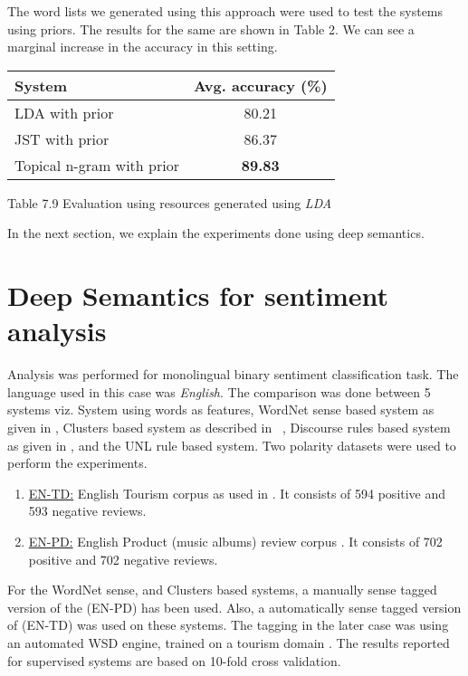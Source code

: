The word lists we generated using this approach were used to test the systems using priors. The results for the same
are shown in Table 2. We can see a marginal increase in the accuracy in this setting.

\begin{center}
\begin{tabular}{|l|c|}
\hline \bf System & \bf Avg. accuracy (\%)\\ \hline
LDA with prior & 80.21\\
JST with prior & 86.37\\
Topical n-gram with prior & \textbf{89.83}\\
\hline
\end{tabular}
\end{center}
\begin{center}
 Table 7.9 Evaluation using resources generated using \textit{LDA}
\end{center}

In the next section, we explain the experiments done using deep semantics.

\section{Deep Semantics for sentiment analysis}

Analysis was performed for monolingual binary sentiment classification task. The language used in this case was \textit{English}. The comparison was done between 5 systems 
viz. System using words as features, WordNet sense based system as given in \citep*{balamurali2011harnessing}, Clusters based system as described in ~\citep*{arhaves}, 
Discourse rules based system as given in \citep*{mukherjee2012sentiment}, and the UNL rule based system. Two polarity datasets were used to perform the experiments. 
    
\begin{enumerate}
  \item \underline{EN-TD:} English Tourism corpus as used in \citep*{ye2009sentiment}. It consists of 594 positive and 593 negative reviews.
  \item \underline{EN-PD:} English Product (music albums) review corpus \citep*{blitzer2007biographies}. It consists of 702 positive and 702 negative 
  reviews. 
\end{enumerate}
   
For the WordNet sense, and Clusters based systems, a manually sense tagged version of the (EN-PD) has been used. Also, a automatically sense tagged version of 
(EN-TD) was used on these systems. The tagging in the later case was using an automated WSD engine, trained on a tourism domain \citep*{balamurali2013lost}.
The results reported for supervised systems are based on 10-fold cross validation.
   
